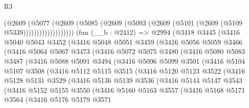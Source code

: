 \begin{lexlean}{R3}
\begin{coremodule}
                      (@2609
                        (@5077
                          (@2609
                            (@5085
                              (@2609 (@5093 (@2609 (@5101 (@2609 (@5109 @5339)))))))))))))))))))
    (fun (__b : @2412) =>
    @2994
      (@3418
        @3445
        (@3416
          @5040
          @5043
          @3452
          (@3416
            @5048
            @5051
            @3459
            (@3416
              @5056
              @5059
              @3466
              (@3416
                @5064
                @5067
                @3473
                (@3416
                  @5072
                  @5075
                  @3480
                  (@3416
                    @5080
                    @5083
                    @3487
                    (@3416
                      @5088
                      @5091
                      @3494
                      (@3416
                        @5096
                        @5099
                        @3501
                        (@3416
                          @5104
                          @5107
                          @3508
                          (@3416
                            @5112
                            @5115
                            @3515
                            (@3416
                              @5120
                              @5123
                              @3522
                              (@3416
                                @5128
                                @5131
                                @3529
                                (@3416
                                  @5136
                                  @5139
                                  @3536
                                  (@3416
                                    @5144
                                    @5147
                                    @3543
                                    (@3416
                                      @5152
                                      @5155
                                      @3550
                                      (@3416
                                        @5160
                                        @5163
                                        @3557
                                        (@3416
                                          @5168
                                          @5171
                                          @3564
                                          (@3416
                                            @5176
                                            @5179
                                            @3571

\end{coremodule}
\end{lexlean}
